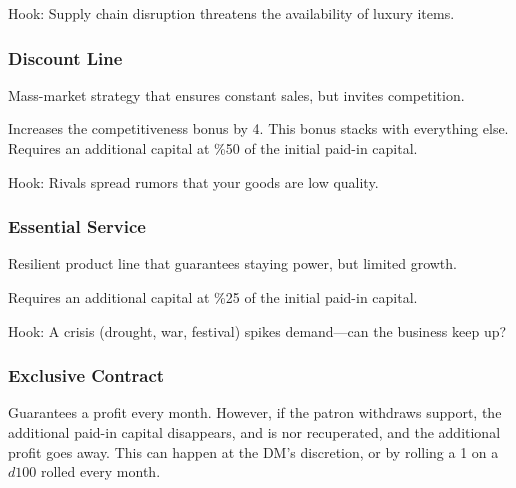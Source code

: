 \documentclass[twocolumn]{dndbook}
\begin{document}
Hook: Supply chain disruption threatens the availability of luxury items.\par


\subsubsection{Discount Line}


Mass-market strategy that ensures constant sales, but invites competition.\par

\begin{DndComment}[color=bgtan2018]{}
	Increases the competitiveness bonus by 4.
	This bonus stacks with everything else.
	Requires an additional capital at \%50 of the initial paid-in capital.
\end{DndComment}

Hook: Rivals spread rumors that your goods are low quality.\par


\subsubsection{Essential Service}

Resilient product line that guarantees staying power, but limited growth.\par

\begin{DndComment}[color=bgtan2018]{}
	Requires an additional capital at \%25 of the initial paid-in capital.
\end{DndComment}



Hook: A crisis (drought, war, festival) spikes demand—can the business keep up?\par


\subsubsection{Exclusive Contract}



Guarantees a profit every month. However, if the patron withdraws support,
the additional paid-in capital disappears, and is nor recuperated, and
the additional profit goes away. This can happen at the DM's discretion,
or by rolling a 1 on a $d100$ rolled every month.\par
\end{document}
